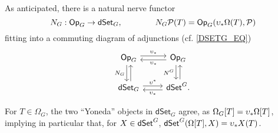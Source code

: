 \documentclass[a4paper,10pt
,draft
]{article}%
\begin{document}

As anticipated, there is a natural nerve functor
\begin{equation}
      N_G: \Op_G \to \dSet_G, \qquad \qquad N_G\P(T) = \Op_G(\upsilon_{\**}\Omega(T), \P)
\end{equation}
fitting into a commuting diagram of adjunctions (cf. \eqref{DSETG_EQ}) 
\begin{equation}
      \label{OP_ADJ_EQ}
      \begin{tikzcd}
            \Op_G \arrow[d, shift right, "N_G"'] \arrow[r, shift left, "\upsilon_{\**}"]
            &
            \Op_G \arrow[d, shift right, "N^G"'] \arrow[l, shift left, "\upsilon_{\**}"]
            \\
            \dSet_G \arrow[u, shift right] \arrow[r, shift left, "\upsilon^{\**}"]
            &
            \dSet^G \arrow[u, shift right] \arrow[l, shift left, "\upsilon_{\**}"].
      \end{tikzcd}
\end{equation}

\begin{remark}
      For $T \in \Omega_G$, the two ``Yoneda'' objects in $\mathsf{dSet}_G$ agree, as
      \mbox{$\Omega_G[T] = \upsilon_{\**}\Omega[T]$},
      implying in particular that, for $X \in \mathsf{dSet}^G$,
      $\dSet^G(\Omega[T],X) = \upsilon_{\**}X(T)$.
\end{remark}
\end{document}
